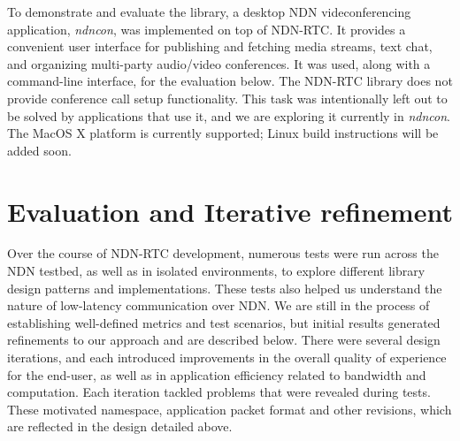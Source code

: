 \documentclass{icn/sig-alternate-2013} %
\newcommand{\ndnrtcName}{NDN-RTC} %
\newcommand{\ndnconName}{\emph{ndncon}}
\begin{document}

To demonstrate and evaluate the library, a desktop NDN videconferencing application, \ndnconName{}, \cite{ndncon} was implemented on top of \ndnrtcName{}. It provides a convenient user interface for publishing and fetching media streams, text chat, and organizing multi-party audio/video conferences. It was used, along with a command-line interface, for the evaluation below.
The \ndnrtcName{} library does not provide conference call setup functionality. This task was intentionally left out to be solved by applications that use it, and we are exploring it currently in \ndnconName{}.  The MacOS X platform is currently supported; Linux build instructions will be added soon. %

\section{Evaluation and Iterative refinement}
\label{sec:eval} 
Over the course of \ndnrtcName{} development, numerous tests were run across the NDN testbed, as well as in isolated environments, to explore different library design patterns and implementations. These tests also helped us understand the nature of low-latency communication over NDN. We are still in the process of establishing well-defined metrics and test scenarios, but initial results generated refinements to our approach and are described below.
There were several design iterations, and each introduced improvements in the overall quality of experience for the end-user, as well as in application efficiency related to bandwidth and computation. Each iteration tackled problems that were revealed during tests. These motivated namespace, application packet format and other revisions, which are reflected in the design detailed above.%
\end{document}
